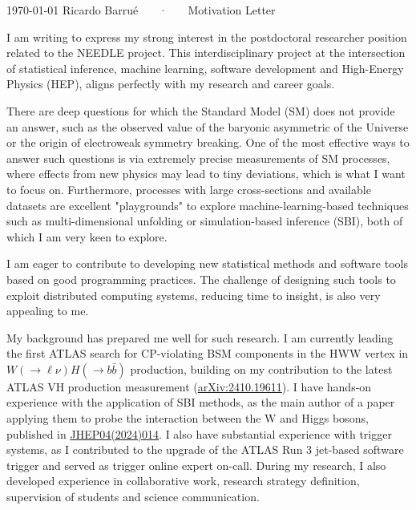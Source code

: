 \documentclass[11pt, a4paper]{awesome-cv}
\begin{document}
\makecvheader[R]

\makecvfooter
  {\today}
  {Ricardo Barrué ~~~·~~~ Motivation Letter}
  {}

\makelettertitle

\begin{cvletter}

I am writing to express my strong interest in the postdoctoral researcher position related to the NEEDLE project. This interdisciplinary project at the intersection of statistical inference, machine learning, software development and High-Energy Physics (HEP), aligns perfectly with my research and career goals.

There are deep questions for which the Standard Model (SM) does not provide an answer, such as the observed value of the baryonic asymmetric of the Universe or the origin of electroweak symmetry breaking. One of the most effective ways to answer such questions is via extremely precise measurements of SM processes, where effects from new physics may lead to tiny deviations, which is what I want to focus on. Furthermore, processes with large cross-sections and available datasets are excellent "playgrounds" to explore machine-learning-based techniques such as multi-dimensional unfolding or simulation-based inference (SBI), both of which I am very keen to explore.

I am eager to contribute to developing new statistical methods and software tools based on good programming practices. The challenge of designing such tools to exploit distributed computing systems, reducing time to insight, is also very appealing to me.

My background has prepared me well for such research. I am currently leading the first ATLAS search for CP-violating BSM components in the HWW vertex in $W(\to \ell \nu)H(\to b\bar{b})$ production, building on my contribution to the latest ATLAS VH production measurement (\href{https://arxiv.org/abs/2410.19611}{arXiv:2410.19611}). I have hands-on experience with the application of SBI methods, as the main author of a paper applying them to probe the interaction between the W and Higgs bosons, published in \href{http://dx.doi.org/10.1007/JHEP04(2024)014}{JHEP04(2024)014}. I also have substantial experience with trigger systems, as I contributed to the upgrade of the ATLAS Run 3 jet-based software trigger and served as trigger online expert on-call. During my research, I also developed experience in collaborative work, research strategy definition, supervision of students and science communication.


\end{cvletter}
\end{document}

